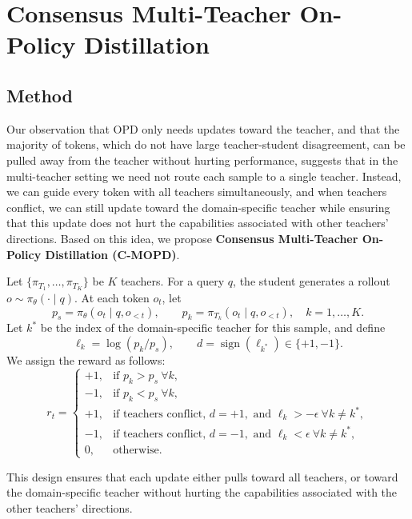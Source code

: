 \documentclass{article}
\theoremstyle{remark}
\begin{document}
\section{Consensus Multi-Teacher On-Policy Distillation}
\label{sec:c-mopd}

\subsection{Method}
\label{sec:c-mopd-method}

Our observation that OPD only needs updates toward the teacher, and that the majority of tokens, which do not have large teacher-student disagreement, can be pulled away from the teacher without hurting performance, suggests that in the multi-teacher setting we need not route each sample to a single teacher. Instead, we can guide every token with all teachers simultaneously, and when teachers conflict, we can still update toward the domain-specific teacher while ensuring that this update does not hurt the capabilities associated with other teachers' directions. Based on this idea, we propose \textbf{Consensus Multi-Teacher On-Policy Distillation (C-MOPD)}.

Let \(\{\pi_{T_1}, \dots, \pi_{T_K}\}\) be \(K\) teachers. For a query \(q\), the student generates a rollout \(o \sim \pi_\theta(\cdot \mid q)\). At each token \(o_t\), let
\[
p_s = \pi_\theta(o_t \mid q, o_{<t}), \qquad
p_k = \pi_{T_k}(o_t \mid q, o_{<t}), \quad k = 1, \dots, K.
\]
Let \(k^*\) be the index of the domain-specific teacher for this sample, and define
\[
\ell_k = \log(p_k / p_s), \qquad d = \operatorname{sign}(\ell_{k^*}) \in \{+1, -1\}.
\]
We assign the reward as follows:
\[
r_t =
\begin{cases}
+1, & \text{if } p_k > p_s \ \forall k, \\[2pt]
-1, & \text{if } p_k < p_s \ \forall k, \\[2pt]
+1, & \text{if teachers conflict, } d = +1, \text{ and } \ell_k > -\epsilon \ \forall k \neq k^*, \\[2pt]
-1, & \text{if teachers conflict, } d = -1, \text{ and } \ell_k < \epsilon \ \forall k \neq k^*, \\[2pt]
0,  & \text{otherwise}.
\end{cases}
\]

This design ensures that each update either pulls toward all teachers, or toward the domain-specific teacher without hurting the capabilities associated with the other teachers' directions.
\end{document}
